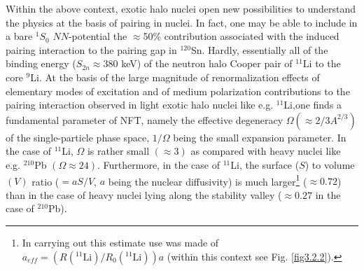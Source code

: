  
 Within the above context, exotic halo nuclei open new possibilities to understand the physics at the basis of pairing in nuclei. In fact, one may be able to include in a bare $^1S_0$ $NN$-potential the $\approx$50\% contribution associated with the induced pairing interaction to the pairing gap in $^{120}$Sn. Hardly, essentially all of the binding energy ($S_{2n}\approx380$ keV) of the neutron halo Cooper pair of $^{11}$Li to the core $^{9}$Li. At the basis of the large magnitude of renormalization effects of elementary modes of excitation and of medium polarization contributions to the pairing interaction observed in light exotic halo nuclei like e.g. $^{11}$Li,one finds a fundamental parameter of NFT, namely the effective degeneracy $\Omega(\approx2/3A^{2/3})$ of the single-particle phase space, $1/\Omega$ being the small expansion parameter. In the case of $^{11}$Li, $\Omega$ is rather small $(\approx3)$ as compared with heavy nuclei like e.g. $^{210}$Pb $(\Omega\approx24)$. Furthermore, in the case of $^{11}$Li, the surface ($S$) to volume $(V)$ ratio ($=aS/V$, $a$ being the nuclear diffusivity) is much larger\footnote{In carrying out this estimate use was made of $a_{eff}=\left(R(^{11}\text{Li})/R_0(^{11}\text{Li})\right)a$ (within this context see Fig. \ref{fig3.2.2}).} ($\approx0.72$) than in the case of heavy nuclei lying along the stability valley ($\approx0.27$ in the case of $^{210}$Pb).
